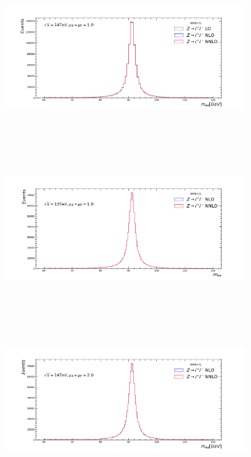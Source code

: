 \begin{figure}[H]
\centering
\begin{subfigure}{0.49\textwidth}
\includegraphics[height=6cm ,width=\textwidth]{chapter4/Mll_rf1_14.pdf}
\vspace*{-8mm}
\caption{}
\label{mll14}
\end{subfigure}
\begin{subfigure}{0.49\textwidth}
\includegraphics[height=6cm, width=\textwidth]{chapter4/Mll_rf1_13.pdf}
\vspace*{-8mm}
\caption{}
\label{mll13}
\end{subfigure}
\begin{subfigure}{0.49\textwidth}
\includegraphics[height=6cm, width=\textwidth]{chapter4/Mll_rf2_14.pdf}
\vspace*{-8mm}

\end{subfigure}
\end{figure}
